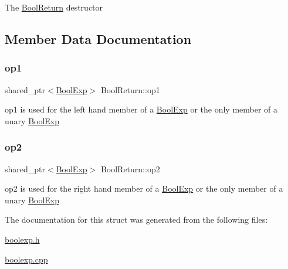 The \mbox{\hyperlink{structBoolReturn}{Bool\+Return}} destructor 

\subsection{Member Data Documentation}
\mbox{\label{structBoolReturn_a16f84cab94347ac45de9dac81a932a66}} 
\subsubsection{\texorpdfstring{op1}{op1}}
{\footnotesize\ttfamily shared\+\_\+ptr$<$\mbox{\hyperlink{classBoolExp}{Bool\+Exp}}$>$ Bool\+Return\+::op1}

op1 is used for the left hand member of a \mbox{\hyperlink{classBoolExp}{Bool\+Exp}} or the only member of a unary \mbox{\hyperlink{classBoolExp}{Bool\+Exp}} \mbox{\label{structBoolReturn_aac386029dd2fe9c58e818c359143c124}} 
\subsubsection{\texorpdfstring{op2}{op2}}
{\footnotesize\ttfamily shared\+\_\+ptr$<$\mbox{\hyperlink{classBoolExp}{Bool\+Exp}}$>$ Bool\+Return\+::op2}

op2 is used for the right hand member of a \mbox{\hyperlink{classBoolExp}{Bool\+Exp}} or the only member of a unary \mbox{\hyperlink{classBoolExp}{Bool\+Exp}} 

The documentation for this struct was generated from the following files\+:\begin{DoxyCompactItemize}
\item 
\mbox{\hyperlink{boolexp_8h}{boolexp.\+h}}\item 
\mbox{\hyperlink{boolexp_8cpp}{boolexp.\+cpp}}\end{DoxyCompactItemize}

